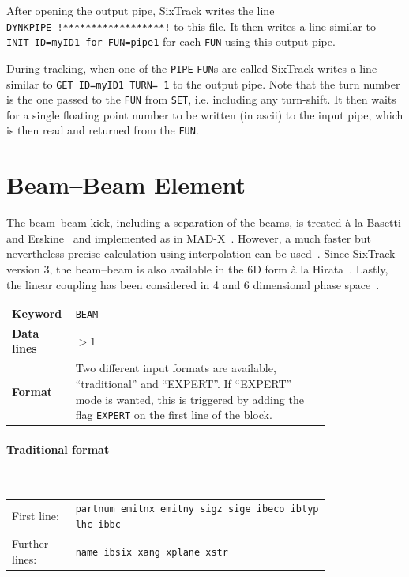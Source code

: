 After opening the output pipe, SixTrack writes the line \texttt{DYNKPIPE~!******************!} to this file.
It then writes a line similar to \texttt{INIT~ID=myID1~for~FUN=pipe1} for each \texttt{FUN} using this output pipe.

During tracking, when one of the \texttt{PIPE} \texttt{FUN}s are called SixTrack writes a line similar to \texttt{GET ID=myID1 TURN=~1} to the output pipe.
Note that the turn number is the one passed to the \texttt{FUN} from \texttt{SET}, i.e. including any turn-shift.
It then waits for a single floating point number to be written (in ascii) to the input pipe, which is then read and returned from the \texttt{FUN}.

\section{Beam--Beam Element} \label{BeamBeam}

The beam--beam kick, including a separation of the beams, is treated \`{a} la Basetti and Erskine~\cite{BasErs} and implemented as in MAD-X~\cite{MAD}.
However, a much faster but nevertheless precise calculation using interpolation can be used~\cite{ERIC}.
Since SixTrack version 3, the beam--beam is also available in the 6D form \`{a} la Hirata~\cite{Hirata}.
Lastly, the linear coupling has been considered in 4 and 6 dimensional phase space~\cite{ripbeam}. 

\bigskip
\begin{tabular}{@{}lp{0.8\linewidth}}
    \textbf{Keyword}    & \texttt{BEAM} \\
    \textbf{Data lines} & $>1$ \\
    \textbf{Format}     & Two different input formats are available, ``traditional'' and ``EXPERT''. If ``EXPERT'' mode is wanted, this is triggered by adding the flag \texttt{EXPERT} on the first line of the block.
\end{tabular}

\paragraph{Traditional format}~\\

\bigskip
\begin{tabular}{@{}lp{0.8\linewidth}}
    First line:    & \texttt{partnum emitnx emitny sigz sige ibeco ibtyp lhc ibbc} \\
    Further lines: & \texttt{name ibsix xang xplane xstr}
\end{tabular}

